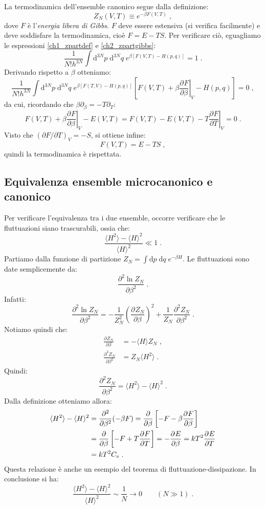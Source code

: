 \documentclass[10pt,a4paper]{report}
\theoremstyle{definition}
\newcommand{\pdev}[3][]{\frac{\partial^{#1} #2}{\partial #3^{#1}}}
\numberwithin{equation}{section}
\newcommand{\diff}[1][]{\mathrm{d}#1}
\newcommand{\bra}{\langle}
\newcommand{\ket}{\rangle}
\begin{document}
La termodinamica dell'ensemble canonico segue dalla definizione:
\begin{equation}
Z_N(V,T)\equiv e^{-\beta F(V,T)}\;, \label{ch2_zpartgibbs}
\end{equation}
dove $F$ è l'\emph{energia libera di Gibbs}. $F$ deve essere estensiva (si verifica facilmente) e deve soddisfare la termodinamica, cioè $F=E-TS$. Per verificare ciò, eguagliamo le espressioni \eqref{ch1_zpartdef} e \eqref{ch2_zpartgibbs}:
$$
\frac{1}{N!h^{3N}}\int\diff^{3N}{p}\;\diff^{3N}{q}\; e^{\beta[F(V,T)-H(p,q)]}=1\;.
$$
Derivando rispetto a $\beta$ otteniamo:
$$
\frac{1}{N!h^{3N}}\int\diff^{3N}{p}\;\diff^{3N}{q}\;e^{\beta[F(T,V)-H(p,q)]}\left[F(V,T)+\beta\left.\pdev{F}{\beta}\right|_V-H(p,q)\right]=0\;,
$$
da cui, ricordando che $\beta\partial_{\beta}=-T\partial_{T}$:
$$
F(V,T)+\beta\left.\pdev{F}{\beta}\right|_V-E(V,T)=F(V,T)-E(V,T)-T\left.\pdev{F}{T}\right|_V=0\;.
$$
Visto che $(\partial F/\partial T)_V=-S$, si ottiene infine:
\begin{equation}
F(V,T)=E-TS\;,
\end{equation}
quindi la termodinamica è rispettata.
\subsection{Equivalenza ensemble microcanonico e canonico}
Per verificare l'equivalenza tra i due ensemble, occorre verificare che le fluttuazioni siano trascurabili, ossia che:
\begin{equation}
\frac{\bra H^2\ket -\bra H\ket^2}{\bra H\ket^2}\ll 1\;.
\end{equation}
Partiamo dalla funzione di partizione $Z_N=\int \diff{p}\;\diff{q}\; e^{-\beta H}$. Le fluttuazioni sono date semplicemente da:
$$
\pdev[2]{\ln Z_N}{\beta}\;.
$$
Infatti:
\begin{equation}
\pdev[2]{\ln Z_N}{\beta}=-\frac{1}{Z_N^2}\left(\pdev{Z_N}{\beta}\right)^2+\frac{1}{Z_N}\pdev[2]{Z_N}{\beta}\;.
\end{equation}
Notiamo quindi che:
\begin{align}
\pdev{Z_N}{\beta} &= -\bra H\ket Z_N\;, \\
\pdev[2]{Z_N}{\beta} &= Z_N\bra H^2\ket\;.
\end{align}
Quindi:
\begin{equation}
\pdev[2]{Z_N}{\beta}=\bra H^2\ket -\bra H\ket^2\;.
\end{equation}
Dalla definizione otteniamo allora:
\begin{align}
\bra H^2\ket-\bra H\ket^2 &= \frac{\partial^2}{\partial\beta^2}(-\beta F)=\frac{\partial}{\partial\beta}\left[-F-\beta\pdev{F}{\beta}\right] \notag \\
&= \frac{\partial}{\partial\beta}\left[-F+T\pdev{F}{T}\right]=-\pdev{E}{\beta} = kT^2\pdev{E}{T} \notag \\
&= kT^2C_v\;.
\end{align}
Questa relazione è anche un esempio del teorema di fluttuazione-dissipazione. In conclusione si ha:
\begin{equation}
\frac{\bra H^2\ket-\bra H\ket^2}{\bra H\ket^2}\sim \frac{1}{N}\to 0\qquad (N\gg 1)\;.
\end{equation}
\end{document}
